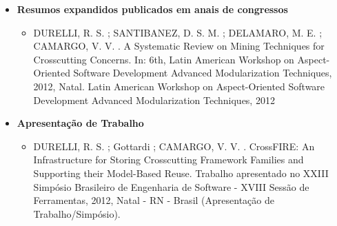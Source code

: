 \begin{itemize}
	 \item \textbf{Resumos expandidos publicados em anais de congressos}

	 \begin{itemize}
	 	\item DURELLI, R. S. ; SANTIBANEZ, D. S. M. ; DELAMARO, M. E. ; CAMARGO, V. V. . A Systematic Review on Mining Techniques for Crosscutting Concerns. In: 6th, Latin American Workshop on Aspect-Oriented Software Development Advanced Modularization Techniques, 2012, Natal. Latin American Workshop on Aspect-Oriented Software Development Advanced Modularization Techniques, 2012
	 \end{itemize}

	 \item \textbf{Apresentação de Trabalho}

	 \begin{itemize}
	 	\item DURELLI, R. S. ; Gottardi ; CAMARGO, V. V. . CrossFIRE: An Infrastructure for Storing Crosscutting Framework Families and Supporting their Model-Based Reuse. Trabalho apresentado no XXIII Simpósio Brasileiro de Engenharia de Software - XVIII Sessão de Ferramentas, 2012, Natal - RN - Brasil (Apresentação de Trabalho/Simpósio).
	 \end{itemize}

\end{itemize}